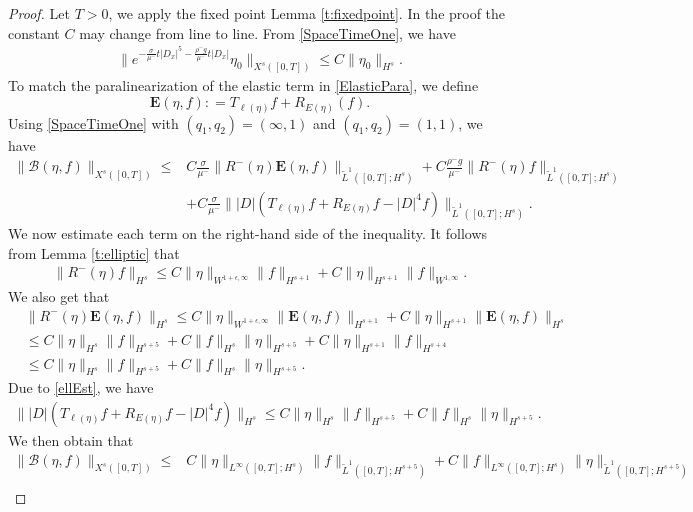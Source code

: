 \documentclass[12pt]{amsart}
\theoremstyle{definition}
\numberwithin{equation}{section}
\newcommand{\e}{\epsilon}
\newcommand{\f}{\frac}
\begin{document}
\begin{proof}
Let $T>0$, we apply the fixed point Lemma \ref{t:fixedpoint}. 
In the proof the constant $C$ may change from line to line.
From \eqref{SpaceTimeOne}, we have
\begin{align*}
\| e^{- \f{\sigma}{\mu^-}t|D_x|^5 - \frac{\rho^- g}{\mu^-}t|D_x|} \eta_0\|_{X^s([0,T])}
\leq C\|\eta_0\|_{H^s}.
\end{align*}
To match the paralinearization of the elastic term in \eqref{ElasticPara}, we define 
\begin{equation*}
 \mathbf{E}(\eta, f) : = T_{\ell(\eta)} f + R_{E(\eta)} (f).
\end{equation*}
Using \eqref{SpaceTimeOne} with $(q_1,q_2)=(\infty,1)$ and $(q_1,q_2)=(1,1)$, we have
\begin{align*}
\|\mathcal{B}(\eta,f)\|_{X^s([0,T])}
\leq& C\f{\sigma}{\mu^-}\|R^-(\eta)\mathbf{E}(\eta,f) \|_{\tilde{L}^1([0,T];H^s)}+C\f{\rho^- g}{\mu^-} \|R^-(\eta) f \|_{\tilde{L}^1([0,T];H^s)}\\
&+C\f{\sigma}{\mu^-}\||D|(T_{\ell(\eta)}f+R_{E(\eta)}f - |D|^4f)  \|_{\tilde{L}^1([0,T];H^s)}.
\end{align*}
We now estimate each term on the right-hand side of the inequality.
It follows from Lemma \ref{t:elliptic} that
\begin{align*}
\|R^-(\eta) f \|_{H^s}\leq C\|\eta\|_{W^{1+\e,\infty}}\|f\|_{H^{s+1}}+C\|\eta\|_{H^{s+1}}\|f\|_{W^{1,\infty}}.
\end{align*}
We also get that
\begin{align*}
&\|R^-(\eta)\mathbf{E}(\eta,f) \|_{H^s}
\leq C\|\eta\|_{W^{1+\e,\infty}}\|\mathbf{E}(\eta,f)\|_{H^{s+1}}+C\|\eta\|_{H^{s+1}}\|\mathbf{E}(\eta,f)\|_{H^s}\\
&\leq C\|\eta\|_{H^s}\|f\|_{H^{s+5}}+C\|f\|_{H^s}\|\eta\|_{H^{s+5}}
+C\|\eta\|_{H^{s+1}}\|f\|_{H^{s+4}}\\
&\leq C\|\eta\|_{H^s}\|f\|_{H^{s+5}}+C\|f\|_{H^s}\|\eta\|_{H^{s+5}}.
\end{align*}
Due to \eqref{ellEst}, we have 
\begin{align*}
\||D|(T_{\ell(\eta)}f+R_{E(\eta)}f - |D|^4f)\|_{H^s}\leq C\|\eta\|_{H^s}\|f\|_{H^{s+5}}+C\|f\|_{H^s}\|\eta\|_{H^{s+5}}.
\end{align*}
We then obtain that 
\begin{equation} \label{check:cB1}
\begin{aligned}
\|\mathcal{B}(\eta,f)\|_{X^s([0,T])}\leq&C\|\eta\|_{L^{\infty}([0,T];H^s)}\|f\|_{\tilde{L}^{1}([0,T];H^{s+5})}+C\|f\|_{L^{\infty}([0,T];H^s)}\|\eta\|_{\tilde{L}^{1}([0,T];H^{s+5})}\\

\end{aligned}
\end{equation}
\end{proof}
\end{document}
